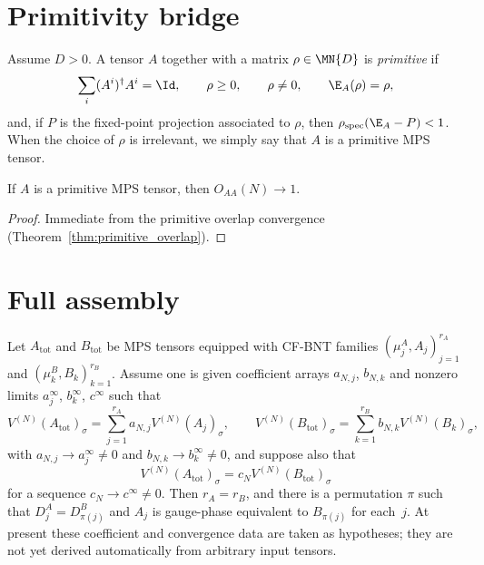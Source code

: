 \section{Primitivity bridge}

\begin{definition}\label{def:primitive_mps}
	\leanok
	Assume $D > 0$.
	A tensor $A$ together with a matrix $\rho \in \MN{D}$ is
	\emph{primitive} if
	\[
		\sum_i (A^i)^\dagger A^i = \Id,
		\qquad \rho \ge 0,
		\qquad \rho \neq 0,
		\qquad \E_A(\rho) = \rho,
	\]
	and, if $P$ is the fixed-point projection associated to $\rho$,
	then $\rho_{\mathrm{spec}}(\E_A - P) < 1$.
	When the choice of $\rho$ is irrelevant, we simply say that $A$
	is a primitive MPS tensor.
\end{definition}

\begin{theorem}\label{thm:prim_overlap_one}
	\leanok
	If $A$ is a primitive MPS tensor, then
	$O_{AA}(N) \to 1$.
\end{theorem}

\begin{proof}\leanok{}
	Immediate from the primitive overlap convergence
	(Theorem~\ref{thm:primitive_overlap}).
\end{proof}

\section{Full assembly}

\begin{theorem}\label{thm:ft_proportional}
	\leanok
	Let $A_{\mathrm{tot}}$ and $B_{\mathrm{tot}}$ be MPS tensors
	equipped with CF-BNT families $(\mu_j^A, A_j)_{j=1}^{r_A}$ and
	$(\mu_k^B, B_k)_{k=1}^{r_B}$.
	Assume one is given coefficient arrays $a_{N,j}$, $b_{N,k}$ and
	nonzero limits $a_j^\infty$, $b_k^\infty$, $c^\infty$ such that
	\[
		V^{(N)}(A_{\mathrm{tot}})_\sigma
		= \sum_{j=1}^{r_A} a_{N,j} V^{(N)}(A_j)_\sigma,
		\qquad
		V^{(N)}(B_{\mathrm{tot}})_\sigma
		= \sum_{k=1}^{r_B} b_{N,k} V^{(N)}(B_k)_\sigma,
	\]
	with $a_{N,j} \to a_j^\infty \neq 0$ and
	$b_{N,k} \to b_k^\infty \neq 0$, and suppose also that
	\[
		V^{(N)}(A_{\mathrm{tot}})_\sigma
		= c_N V^{(N)}(B_{\mathrm{tot}})_\sigma
	\]
	for a sequence $c_N \to c^\infty \neq 0$.
	Then $r_A = r_B$, and there is a permutation $\pi$ such that
	$D_j^A = D_{\pi(j)}^B$ and $A_j$ is gauge-phase equivalent to
	$B_{\pi(j)}$ for each~$j$.
	At present these coefficient and convergence data are taken as
	hypotheses; they are not yet derived automatically from arbitrary
	input tensors.
\end{theorem}

